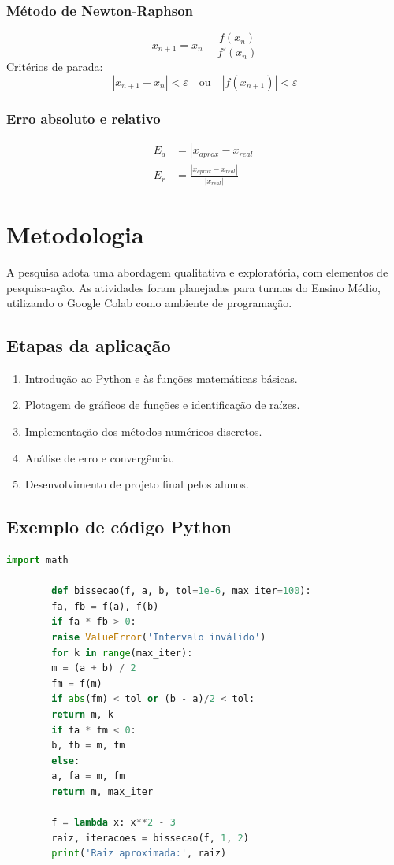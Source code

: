\documentclass[12pt,a4paper]{report}
\begin{document}
	\subsection{Método de Newton-Raphson}
	\begin{equation}
		x_{n+1} = x_n - \frac{f(x_n)}{f'(x_n)}
	\end{equation}
	Critérios de parada:
	\begin{equation}
		|x_{n+1} - x_n| < \varepsilon \quad \text{ou} \quad |f(x_{n+1})| < \varepsilon
	\end{equation}
	
	\subsection{Erro absoluto e relativo}
	\begin{align}
		E_a &= |x_{aprox} - x_{real}| \\
		E_r &= \frac{|x_{aprox} - x_{real}|}{|x_{real}|}
	\end{align}
	
	\newpage
	\chapter{Metodologia}
	
	A pesquisa adota uma abordagem qualitativa e exploratória, com elementos de pesquisa-ação. As atividades foram planejadas para turmas do Ensino Médio, utilizando o Google Colab como ambiente de programação.
	
	\section{Etapas da aplicação}
	\begin{enumerate}
		\item Introdução ao Python e às funções matemáticas básicas.
		\item Plotagem de gráficos de funções e identificação de raízes.
		\item Implementação dos métodos numéricos discretos.
		\item Análise de erro e convergência.
		\item Desenvolvimento de projeto final pelos alunos.
	\end{enumerate}
	
	\section{Exemplo de código Python}
	\begin{lstlisting}[language=Python, caption=Implementação do método da Bisseção]
		import math
		
		def bissecao(f, a, b, tol=1e-6, max_iter=100):
		fa, fb = f(a), f(b)
		if fa * fb > 0:
		raise ValueError('Intervalo inválido')
		for k in range(max_iter):
		m = (a + b) / 2
		fm = f(m)
		if abs(fm) < tol or (b - a)/2 < tol:
		return m, k
		if fa * fm < 0:
		b, fb = m, fm
		else:
		a, fa = m, fm
		return m, max_iter
		
		f = lambda x: x**2 - 3
		raiz, iteracoes = bissecao(f, 1, 2)
		print('Raiz aproximada:', raiz)
	\end{lstlisting}
	
\end{document}
